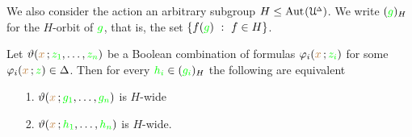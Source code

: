 



We also consider the action an arbitrary subgroup $H\le{\rm Aut\kern.15ex}(\EuScript U\kern-.2ex^{\scriptscriptstyle\Delta})$.
We write \emph{$({\color{green} g})_H$\/} for the $H$-orbit of ${\color{green} g}$, that is, the set $\{f({\color{green} g})\ :\ f\in H\}$.

\begin{proposition}\label{prop_wideHcojugate}
  Let $\vartheta({\color{brown} x}\,;{\color{green} z_1},\dots,{\color{green} z_n})$ be a Boolean combination of formulas $\varphi_i({\color{brown} x}\,;{\color{green} z_i})$ for some $\varphi_i({\color{brown} x}\,;{\color{green} z})\in\Delta$.
  Then for every ${\color{green} h_i}\in({\color{green} g_i})_H$ the following are equivalent
  \begin{itemize}
    \item [1.] $\vartheta({\color{brown} x}\,;{\color{green} g_1},\dots,{\color{green} g_n})$ is $H$-wide
    \item [2.] $\vartheta({\color{brown} x}\,;{\color{green} h_1},\dots,{\color{green} h_n})$ is $H$-wide.
  \end{itemize}
\end{proposition}

